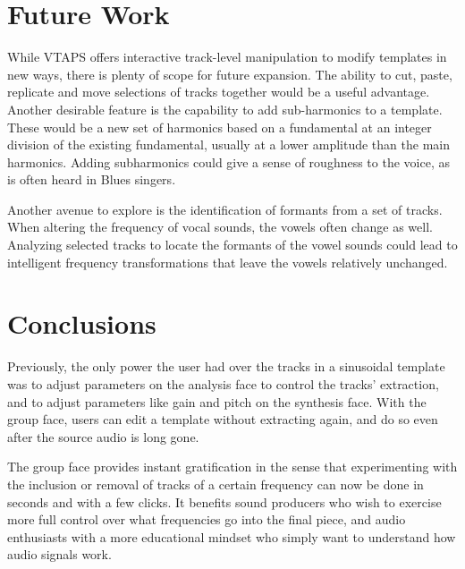\documentclass{article}
\begin{document}
\section{\label{sec:Future-Work}Future Work}

While VTAPS offers interactive track-level manipulation to modify templates in 
new ways, there is plenty of scope for future expansion. The ability to cut, paste, 
replicate and move selections of tracks together would be a useful advantage. 
Another desirable feature is the capability to add sub-harmonics to a template. 
These would be a new set of harmonics based on a fundamental at an integer 
division of the existing fundamental, usually at a lower amplitude than the main 
harmonics. Adding subharmonics could give a sense of roughness to the voice, 
as is often heard in Blues singers. 

Another avenue to explore is the identification of formants from a set of tracks. 
When altering the frequency of vocal sounds, the vowels often change as well. 
Analyzing selected tracks to locate the formants of the vowel sounds could lead 
to intelligent frequency transformations that leave the vowels relatively unchanged. 

\section{Conclusions}

Previously, the only power the user had over the tracks in a sinusoidal
template was to adjust parameters on the analysis face to control the tracks'
extraction, and to adjust parameters like gain and pitch on the synthesis face.
With the group face, users can edit a template without extracting again, and do
so even after the source audio is long gone.

The group face provides instant gratification in the sense that experimenting
with the inclusion or removal of tracks of a certain frequency can now be done
in seconds and with a few clicks. It benefits sound producers who wish to
exercise more full control over what frequencies go into the final piece, and
audio enthusiasts with a more educational mindset who simply want to understand
how audio signals work.

\end{document}
